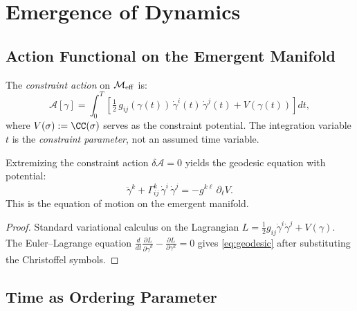 \section{Emergence of Dynamics}
\label{sec:ch14:dynamics}

\subsection{Action Functional on the Emergent Manifold}

\begin{definition}\label{def:14.5}
The \emph{constraint action} on $\mathcal{M}_{\mathrm{eff}}$ is:
\begin{equation}\label{eq:action}
  \mathcal{A}[\gamma] = \int_0^T \left[
    \tfrac{1}{2}\,g_{ij}(\gamma(t))\,
    \dot{\gamma}^i(t)\,\dot{\gamma}^j(t)
    + V(\gamma(t))
  \right] dt,
\end{equation}
where $V(\sigma) := \CC(\sigma)$ serves as the constraint potential.
The integration variable $t$ is the \emph{constraint parameter},
not an assumed time variable.
\end{definition}

\begin{theorem}\label{thm:14.6}
Extremizing the constraint action $\delta\mathcal{A} = 0$ yields the
geodesic equation with potential:
\begin{equation}\label{eq:geodesic}
  \ddot{\gamma}^k + \Gamma^k_{ij}\,\dot{\gamma}^i\,\dot{\gamma}^j
  = -g^{k\ell}\,\partial_\ell V.
\end{equation}
This is the equation of motion on the emergent manifold.
\end{theorem}

\begin{proof}
Standard variational calculus on the Lagrangian
$L = \frac{1}{2}g_{ij}\dot\gamma^i\dot\gamma^j + V(\gamma)$.
The Euler--Lagrange equation $\frac{d}{dt}\frac{\partial L}{\partial
\dot\gamma^k} - \frac{\partial L}{\partial \gamma^k} = 0$ gives
\eqref{eq:geodesic} after substituting the Christoffel symbols.
\end{proof}

\subsection{Time as Ordering Parameter}

